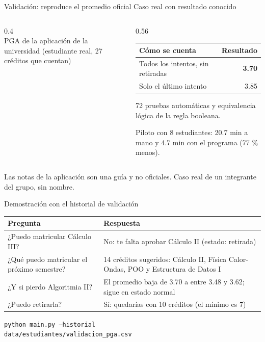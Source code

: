 \documentclass[aspectratio=169,14pt]{beamer}
\newcommand{\unidad}[1]{{\footnotesize\color{gris}#1}\par\vspace{2mm}}
\begin{document}
\begin{frame}{Validación: reproduce el promedio oficial}
\unidad{Caso real con resultado conocido}
\begin{columns}[c]
\begin{column}{0.4\textwidth}
\\[2mm]
{\small PGA de la aplicación de la universidad (estudiante real, 27 créditos que cuentan)}
\end{column}
\begin{column}{0.56\textwidth}
\small
\begin{tabular}{lr}
\toprule
Cómo se cuenta & Resultado\\
\midrule
Todos los intentos, sin retiradas & \textbf{3.70}\\
Solo el último intento & 3.85\\
\bottomrule
\end{tabular}

\vspace{3mm}
72 pruebas automáticas y equivalencia lógica de la regla booleana.

\vspace{2mm}Piloto con 8 estudiantes: 20.7 min a mano y 4.7 min con el programa (77 \% menos).
\end{column}
\end{columns}
\vfill
{\footnotesize\color{gris}Las notas de la aplicación son una guía y no oficiales. Caso real de un integrante del grupo, sin nombre.}
\end{frame}

\begin{frame}{Demostración con el historial de validación}
\small
\begin{tabular}{p{}p{}}
\toprule
Pregunta & Respuesta\\
\midrule
¿Puedo matricular Cálculo III? & No: te falta aprobar Cálculo II (estado: retirada)\\[1mm]
¿Qué puedo matricular el próximo semestre? & 14 créditos sugeridos: Cálculo II, Física Calor-Ondas, POO y Estructura de Datos I\\[1mm]
¿Y si pierdo Algoritmia II? & El promedio baja de 3.70 a entre 3.48 y 3.62; sigue en estado normal\\[1mm]
¿Puedo retirarla? & Sí: quedarías con 10 créditos (el mínimo es 7)\\
\bottomrule
\end{tabular}
\vfill
{\scriptsize\color{gris}\texttt{python main.py --historial}\\\texttt{data/estudiantes/validacion\_pga.csv}}
\end{frame}
\end{document}
